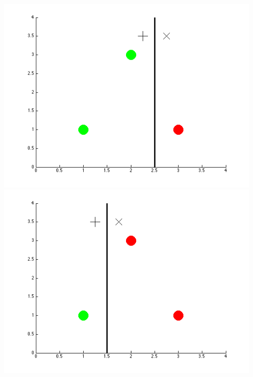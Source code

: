 \documentclass{article}
\begin{document}
\begin{enumerate}
	\includegraphics[scale=0.25]{../images/grg} \hfill \includegraphics[scale=0.25]{../images/grr}\\

\end{enumerate}
\end{document}
